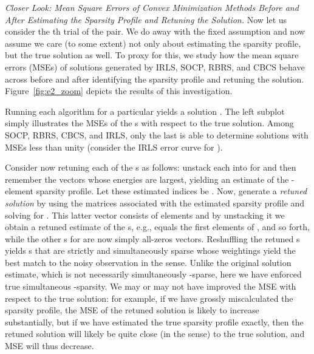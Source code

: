 \documentclass[final]{siamltex}
\begin{document}
   {\em{Closer Look: Mean Square Errors of Convex Minimization Methods
   Before and After Estimating the Sparsity Profile and Retuning the
   Solution}.}  Now let us consider the th trial of the
    pair.  We do away with the
   fixed  assumption and now assume we care (to some extent)
   not only about estimating the sparsity profile, but the true
   solution  as well.  To proxy for this, we study
   how the mean square errors (MSEs) of solutions generated by IRLS,
   SOCP, RBRS, and CBCS behave across  before and after
   identifying the sparsity profile and retuning the solution.
   Figure~\ref{fig:e2_zoom} depicts the results of this investigation.

   Running each algorithm for a particular  yields a solution
   .  The left
   subplot simply illustrates the MSEs of the
   s with respect
   to the true solution. Among SOCP, RBRS, CBCS, and IRLS, only the
   last is able to determine solutions with MSEs less than unity
   (consider the IRLS error curve for ).

   Consider now retuning each of the
   s as follows:
   unstack each into  for  and then remember the  vectors whose
    energies are largest, yielding an estimate of the
   -element sparsity profile.  Let these estimated indices be
   .  Now, generate a {\em{retuned solution}} by
   using the  matrices associated with the estimated sparsity
   profile and solving  for .  This latter vector consists of  elements and
   by unstacking it we obtain a retuned estimate of the
   s, e.g.,
    equals the first 
   elements of , and so forth, while the other
   s for  are now simply all-zeros vectors.  Reshuffling the
   retuned s yields
   s that are strictly and
   simultaneously  sparse whose weightings yield the best match to
   the noisy observation in the  sense.  Unlike the original
   solution estimate, which is not necessarily simultaneously
   -sparse, here we have enforced true simultaneous -sparsity.
   We may or may not have improved the MSE with respect to the true
   solution: for example, if we have grossly miscalculated the
   sparsity profile, the MSE of the retuned solution is likely to
   increase substantially, but if we have estimated the true sparsity
   profile exactly, then the retuned solution will likely be quite
   close (in the  sense) to the true solution, and MSE will
   thus decrease.
   
\end{document}
